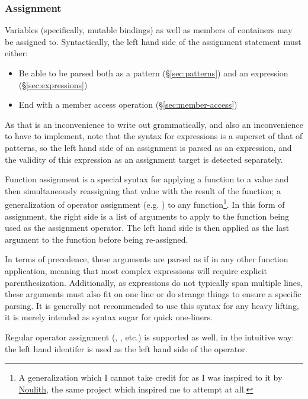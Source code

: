 \subsubsection{Assignment}

Variables (specifically, mutable bindings) as well as members of containers
may be assigned to. Syntactically, the left hand side of the assignment
statement must either:

\begin{itemize}
    \item Be able to be parsed both as a pattern (\S\ref{sec:patterns}) and an expression (\S\ref{sec:expressions})
    \item End with a member access operation (\S\ref{sec:member-access})
\end{itemize}

As that is an inconvenience to write out grammatically, and also an inconvenience
to have to implement, note that the syntax for expressions is a superset of that
of patterns, so the left hand side of an assignment is parsed as an expression, and
the validity of this expression as an assignment target is detected separately.

Function assignment is a special syntax for applying a function to a value and
then simultaneously reassigning that value with the result of the function; a
generalization of operator assignment (e.g. \op{+=}) to any function\footnote{A
generalization which I cannot take credit for as I was inspired to it by
\href{https://github.com/betaveros/noulith}{Noulith}, the same project
which inspired me to attempt \Trilogy{} at all.}. In this form of assignment,
the right side is a list of arguments to apply to the function being used as
the assignment operator. The left hand side is then applied as the last argument
to the function before being re-assigned.

In terms of precedence, these arguments are parsed as if in any other function
application, meaning that most complex expressions will require explicit
parenthesization. Additionally, as expressions do not typically span multiple lines,
these arguments must also fit on one line or do strange things to ensure a specific
parsing. It is generally not recommended to use this syntax for any heavy lifting, it
is merely intended as syntax sugar for quick one-liners.

Regular operator assignment (\op{+=}, \op{-=}, etc.) is supported as well, in the
intuitive way: the left hand identifer is used as the left hand side of the operator.

